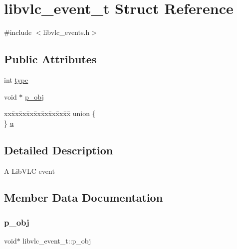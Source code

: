 \hypertarget{structlibvlc__event__t}{}\section{libvlc\+\_\+event\+\_\+t Struct Reference}
\label{structlibvlc__event__t}


{\ttfamily \#include $<$libvlc\+\_\+events.\+h$>$}

\subsection*{Public Attributes}
\begin{DoxyCompactItemize}
\item 
int \hyperlink{structlibvlc__event__t_a017811f024025b4879ad5f942598c096}{type}
\item 
void $\ast$ \hyperlink{structlibvlc__event__t_a414e5f66fb701dc5101168a5d855b872}{p\+\_\+obj}
\item 
\begin{tabbing}
xx\=xx\=xx\=xx\=xx\=xx\=xx\=xx\=xx\=\kill
union \{\\
\} \hyperlink{structlibvlc__event__t_a5fc50a719c82dc3c83af25a8952a8222}{u}\\

\end{tabbing}\end{DoxyCompactItemize}


\subsection{Detailed Description}
A Lib\+V\+LC event 

\subsection{Member Data Documentation}
\mbox{\label{structlibvlc__event__t_a414e5f66fb701dc5101168a5d855b872}} 
\subsubsection{\texorpdfstring{p\+\_\+obj}{p\_obj}}
{\footnotesize\ttfamily void$\ast$ libvlc\+\_\+event\+\_\+t\+::p\+\_\+obj}

